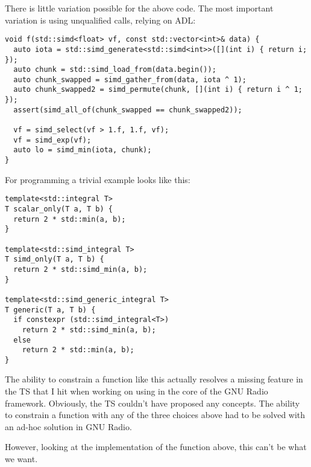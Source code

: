 There is little variation possible for the above code.
The most important variation is using unqualified calls, relying on ADL:
\medskip\begin{lstlisting}[style=Vc]
void f(std::simd<float> vf, const std::vector<int>& data) {
  auto iota = std::simd_generate<std::simd<int>>([](int i) { return i; });
  auto chunk = std::simd_load_from(data.begin());
  auto chunk_swapped = simd_gather_from(data, iota ^ 1);
  auto chunk_swapped2 = simd_permute(chunk, [](int i) { return i ^ 1; });
  assert(simd_all_of(chunk_swapped == chunk_swapped2));

  vf = simd_select(vf > 1.f, 1.f, vf);
  vf = simd_exp(vf);
  auto lo = simd_min(iota, chunk);
}
\end{lstlisting}

For \simdgeneric programming a trivial example looks like this:
\medskip\begin{lstlisting}[style=Vc]
template<std::integral T>
T scalar_only(T a, T b) {
  return 2 * std::min(a, b);
}

template<std::simd_integral T>
T simd_only(T a, T b) {
  return 2 * std::simd_min(a, b);
}

template<std::simd_generic_integral T>
T generic(T a, T b) {
  if constexpr (std::simd_integral<T>)
    return 2 * std::simd_min(a, b);
  else
    return 2 * std::min(a, b);
}
\end{lstlisting}

The ability to constrain a function like this actually resolves a missing
feature in the TS that I hit when working on using \stdx{} in the
core of the GNU Radio framework.
Obviously, the TS couldn't have proposed any concepts.
The ability to constrain a function with any of the three choices above had to
be solved with an ad-hoc solution in GNU Radio.

However, looking at the implementation of the  function above,
this can't be what we want.

